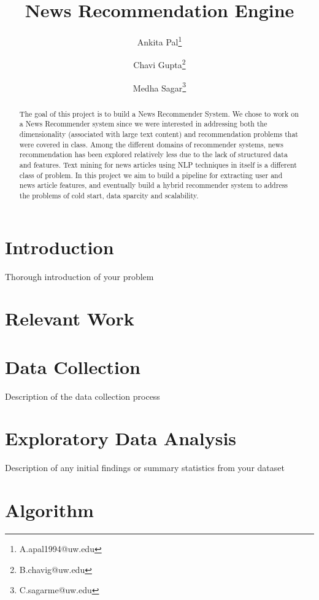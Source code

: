 \documentclass{article}
\title{News Recommendation Engine}
\author[1]{Ankita Pal\thanks{A.apal1994@uw.edu}}
\author[1]{Chavi Gupta\thanks{B.chavig@uw.edu}}
\author[1]{Medha Sagar\thanks{C.sagarme@uw.edu}}
\affil[1]{Department of Data Science, University of Washington}
\begin{document}
\maketitle

\begin{abstract}
    The goal of this project is to build a News Recommender System. We chose to work on a News Recommender system since we were interested in addressing both the dimensionality (associated with large text content) and recommendation problems that were covered in class. Among the different domains of recommender systems, news recommendation has been explored relatively less due to the lack of structured data and features. Text mining for news articles using NLP techniques in itself is a different class of problem. In this project we aim to build a pipeline for extracting user and news article features, and eventually build a hybrid recommender system to address the problems of cold start, data sparcity and scalability. 
\end{abstract}

\section{Introduction}

{Thorough introduction of your problem}

\section{Relevant Work}


\section{Data Collection}

{Description of the data collection process}

\section{Exploratory Data Analysis}

{Description of any initial findings or summary statistics from your dataset}

\section{Algorithm}
\end{document}
